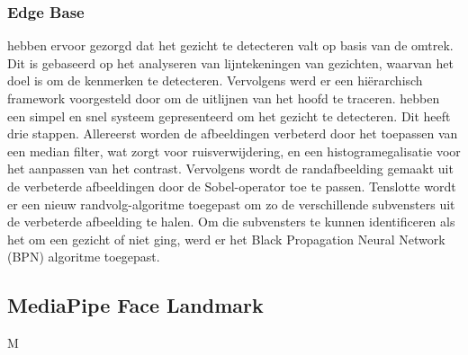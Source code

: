 \subsubsection{Edge Base}
\textcite{sakai1972} hebben ervoor gezorgd dat het gezicht te detecteren valt op basis van de omtrek. Dit is gebaseerd op het analyseren van lijntekeningen van gezichten, waarvan het doel is om de kenmerken te detecteren. Vervolgens werd er een hiërarchisch framework voorgesteld door \textcite{CRAW1987} om de uitlijnen van het hoofd te traceren. \textcite{anila2010} hebben een simpel en snel systeem gepresenteerd om het gezicht te detecteren. Dit heeft drie stappen. Allereerst worden de afbeeldingen verbeterd door het toepassen van een median filter, wat zorgt voor ruisverwijdering, en een histogramegalisatie voor het aanpassen van het contrast. Vervolgens wordt de randafbeelding gemaakt uit de verbeterde afbeeldingen door de Sobel-operator toe te passen. Tenslotte wordt er een nieuw randvolg-algoritme toegepast om zo de verschillende subvensters uit de verbeterde afbeelding te halen. Om die subvensters te kunnen identificeren als het om een gezicht of niet ging, werd er het Black Propagation Neural Network (BPN) algoritme toegepast.

\subsection{MediaPipe Face Landmark}
M